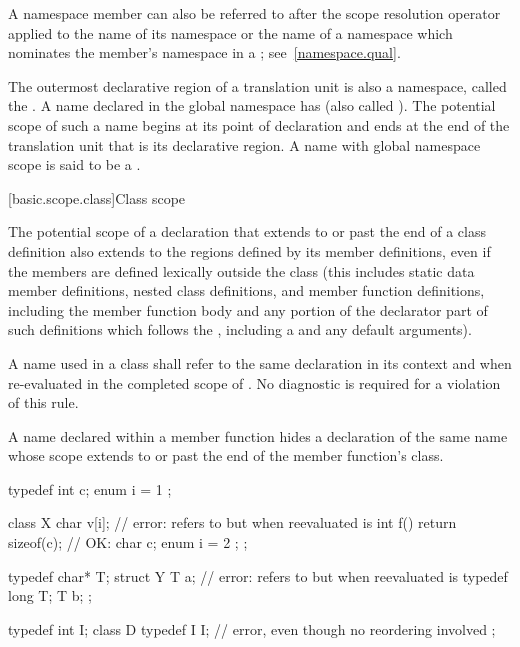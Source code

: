 \pnum
A namespace member can also be referred to after the \tcode{::} scope
resolution operator applied to the name of its
namespace or the name of a namespace which nominates the member's
namespace in a ; see~\ref{namespace.qual}.

\pnum
The outermost declarative region of a translation unit is also a
namespace, called the . A name declared in
the global namespace has  (also called
). The potential scope of such a name begins at
its point of declaration and ends at the end
of the translation unit that is its declarative region.
A name with global namespace scope is said to be a
.

[basic.scope.class]{Class scope}
%

\pnum
The potential scope of a declaration that extends to or past the
end of a class definition also extends to the regions defined by its
member definitions, even if the members are defined lexically outside
the class (this includes static data member definitions, nested class
definitions, and member function definitions, including the member function
body and any portion of the
declarator part of such definitions which follows the ,
including a  and any default
arguments).

\pnum
A name  used in a class  shall refer to the same
declaration in its context and when re-evaluated in the completed scope
of . No diagnostic is required for a violation of this rule.

\pnum
\begin{note}
A name declared within a member function hides a declaration of
the same name whose scope extends to or past the end of the member
function's class.
\end{note}

\pnum
\begin{example}
\begin{codeblock}
typedef int  c;
enum { i = 1 };

class X {
  char  v[i];                       // error:  refers to  but when reevaluated is 
  int  f() { return sizeof(c); }    // OK: 
  char  c;
  enum { i = 2 };
};

typedef char*  T;
struct Y {
  T  a;                             // error:  refers to  but when reevaluated is 
  typedef long  T;
  T  b;
};

typedef int I;
class D {
  typedef I I;                      // error, even though no reordering involved
};
\end{codeblock}
\end{example}

